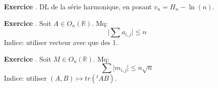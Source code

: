 \documentclass[10pt,a4paper]{article}
\newcounter{question}
\newcounter{exo}
\newenvironment{exo}{\vspace{0.5cm}\setcounter{question}{0}\addtocounter{exo}{1} \noindent \textbf{Exercice \theexo}. \normalsize }{\par}
\begin{document}
	\begin{exo}
		DL de la série harmonique, en posant $v_n = H_n - \ln(n)$.	
	\end{exo}

	\begin{exo}
		Soit $A \in O_n(\mathbb{R})$. Mq:
		$$\vert \sum a_{i,j} \vert \leq n$$ 
		Indice: utiliser vecteur avec que des 1.
	\end{exo}
	
	\begin{exo}
		Soit $M \in O_n(\mathbb{R})$. Mq:
		$$\sum \vert m_{i,j} \vert \leq n \sqrt{n}$$ 
		Indice: utiliser $(A, B) \longmapsto tr({}^t A B)$.
	\end{exo}
	
\end{document}
